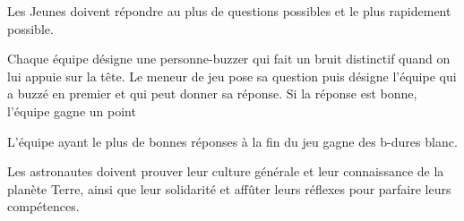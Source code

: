 \documentclass{grand-jeu}
\begin{document}
\begin{liste-materiel}
\end{liste-materiel}

\begin{regles}
Les Jeunes doivent répondre au plus de questions possibles et le plus rapidement possible. 

Chaque équipe désigne une personne-buzzer qui fait un bruit distinctif quand on lui appuie sur la tête.
Le meneur de jeu pose sa question puis désigne l'équipe qui a buzzé en premier et qui peut donner sa réponse. Si la réponse est bonne, l'équipe gagne un point

L'équipe ayant le plus de bonnes réponses à la fin du jeu gagne des b-dures blanc. 
\end{regles}

\begin{imaginaire}
Les astronautes doivent prouver leur culture générale et leur connaissance de la planète Terre, ainsi que leur solidarité et affûter leurs réflexes pour parfaire leurs compétences.
\end{imaginaire}

\begin{moments-stop}
\end{moments-stop}
\end{document}
